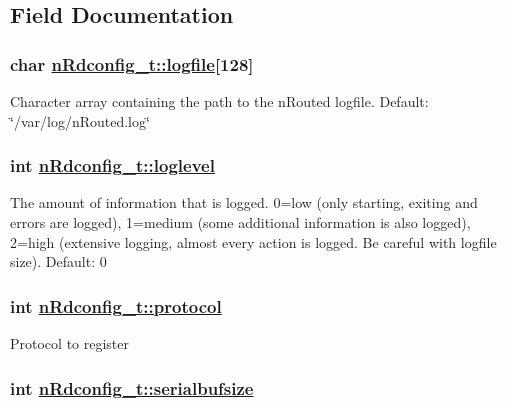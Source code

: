 \subsection{Field Documentation}
\hypertarget{structnRdconfig__t_5dbdadb12b1dfa4a7266f0ac7b4c9ee6}{
\subsubsection[logfile]{\setlength{\rightskip}{0pt plus 5cm}char \hyperlink{structnRdconfig__t_5dbdadb12b1dfa4a7266f0ac7b4c9ee6}{n\-Rdconfig\_\-t::logfile}\mbox{[}128\mbox{]}}}
\label{structnRdconfig__t_5dbdadb12b1dfa4a7266f0ac7b4c9ee6}


Character array containing the path to the n\-Routed logfile. Default: \char`\"{}/var/log/n\-Routed.log\char`\"{} \hypertarget{structnRdconfig__t_22ac64dd30576544d6da3aaad596093f}{
\subsubsection[loglevel]{\setlength{\rightskip}{0pt plus 5cm}int \hyperlink{structnRdconfig__t_22ac64dd30576544d6da3aaad596093f}{n\-Rdconfig\_\-t::loglevel}}}
\label{structnRdconfig__t_22ac64dd30576544d6da3aaad596093f}


The amount of information that is logged. 0=low (only starting, exiting and errors are logged), 1=medium (some additional information is also logged), 2=high (extensive logging, almost every action is logged. Be careful with logfile size). Default: 0 \hypertarget{structnRdconfig__t_69ce236d67271ff0a4c579ab2a9a0698}{
\subsubsection[protocol]{\setlength{\rightskip}{0pt plus 5cm}int \hyperlink{structnRdconfig__t_69ce236d67271ff0a4c579ab2a9a0698}{n\-Rdconfig\_\-t::protocol}}}
\label{structnRdconfig__t_69ce236d67271ff0a4c579ab2a9a0698}


Protocol to register \hypertarget{structnRdconfig__t_fbda9271df1df01f8670ec718d3b73d3}{
\subsubsection[serialbufsize]{\setlength{\rightskip}{0pt plus 5cm}int \hyperlink{structnRdconfig__t_fbda9271df1df01f8670ec718d3b73d3}{n\-Rdconfig\_\-t::serialbufsize}}}
\label{structnRdconfig__t_fbda9271df1df01f8670ec718d3b73d3}


